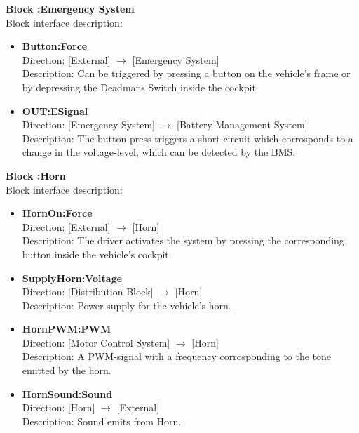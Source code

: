 \textbf{Block :Emergency System}\\
Block interface description:
\begin{itemize}
	\item \textbf{Button:Force}\\
	Direction: [External] $\rightarrow$ [Emergency System]\\
	Description: Can be triggered by pressing a button on the vehicle's frame or by depressing the Deadmans Switch inside the cockpit.
	\item \textbf{OUT:ESignal}\\
	Direction: [Emergency System] $\rightarrow$ [Battery Management System]\\
	Description: The button-press triggers a short-circuit which corrosponds to a change in the voltage-level, which can be detected by the BMS.
\end{itemize}

\textbf{Block :Horn}\\
Block interface description:
\begin{itemize}
	\item \textbf{HornOn:Force}\\
	Direction: [External] $\rightarrow$ [Horn]\\
	Description: The driver activates the system by pressing the corresponding button inside the vehicle's cockpit.
	\item \textbf{SupplyHorn:Voltage}\\
	Direction: [Distribution Block] $\rightarrow$ [Horn]\\
	Description: Power supply for the vehicle's horn.
	\item \textbf{HornPWM:PWM}\\
	Direction: [Motor Control System] $\rightarrow$ [Horn]\\
	Description: A PWM-signal with a frequency corrosponding to the tone emitted by the horn.
	\item \textbf{HornSound:Sound}\\
	Direction: [Horn] $\rightarrow$ [External]\\
	Description: Sound emits from Horn.
\end{itemize}

